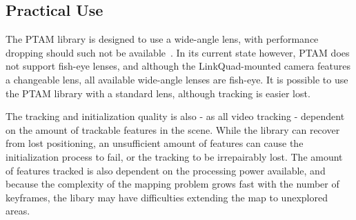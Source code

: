         \subsection{Practical Use}
            The PTAM library is designed to use a wide-angle lens, with
            performance dropping should such not be available~\citep{klein07parallel}.
            In its current state however, PTAM does not support fish-eye lenses, and although
            the LinkQuad-mounted camera features a changeable lens, all
            available wide-angle lenses are fish-eye.
            It is possible to use the PTAM library with a standard lens, although
            tracking is easier lost.

            The tracking and initialization quality is also - as all video tracking - dependent on the
            amount of trackable features in the scene.
            While the library can recover from lost positioning, an unsufficient amount
            of features can cause the initialization process to fail, or the tracking to
            be irrepairably lost.
            The amount of features tracked is also dependent on the processing
            power available, and because the complexity of the mapping
            problem grows fast with the number of keyframes, the libary may
            have difficulties extending the map to unexplored areas.
